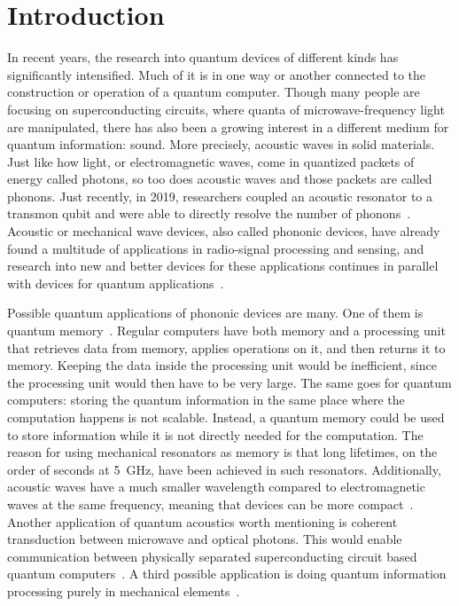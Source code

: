 \chapter{Introduction}

In recent years, the research into quantum devices of different kinds has
significantly intensified.
Much of it is in one way or another connected to the
construction or operation of a quantum computer.
Though many people are focusing on superconducting circuits, where quanta of
microwave-frequency light are manipulated, there has also been
a growing interest in a different medium for quantum information: sound.
More precisely, acoustic waves in solid materials.
Just like how light, or electromagnetic waves, come in quantized packets of energy called
photons,
so too does acoustic waves and those packets are called phonons.
Just recently, in 2019, researchers coupled an acoustic resonator to a transmon
qubit and were able to directly resolve the number of phonons~\cite{arrangoiz-arriola_resolving_2019}.
Acoustic or mechanical wave devices, also called phononic devices, have already
found a multitude of applications in radio-signal processing and sensing, and
research into new and better devices for these applications continues in
parallel with devices for quantum applications~\cite{laer_controlling_2019}.

Possible quantum applications of phononic devices are many.
One of them is quantum memory~\cite{sete_high-efficiency_2015}.
Regular computers have both memory and a processing unit that
retrieves data from memory, applies operations on it, and then returns it to
memory.
Keeping the data inside the processing unit would be inefficient,
since the processing unit would then have to be very large.
The same goes for quantum computers: storing the quantum information in
the same place where the computation happens is not scalable.
Instead, a quantum memory could be used to store information while it is not
directly needed for the computation.
The reason for using mechanical resonators as memory is that long lifetimes, on
the order of seconds at \qty{5}{\giga\hertz}, have been achieved in such
resonators.
Additionally, acoustic waves have a much smaller wavelength compared to
electromagnetic waves at the same frequency, meaning that devices can be more
compact~\cite{maccabe_phononic_2020}.
Another application of quantum acoustics worth mentioning is
coherent transduction between microwave and optical photons.
This would enable communication between physically separated superconducting
circuit based quantum computers~\cite{laer_controlling_2019}.
A third possible application is doing quantum information processing purely in
mechanical elements~\cite{qiao2023developing}.

